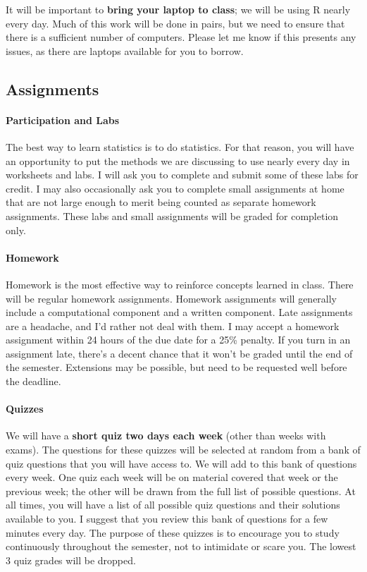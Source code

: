 \documentclass[11pt]{article}
\begin{document}
	It will be important to \textbf{bring your laptop to class}; we will be using R nearly every day.  Much of this work will be done in pairs, but we need to ensure that there is a sufficient number of computers.  Please let me know if this presents any issues, as there are laptops available for you to borrow.
	
	\subsection*{Assignments}
	
	\paragraph{Participation and Labs}
	The best way to learn statistics is to do statistics.  For that reason, you will have an opportunity to put the methods we are discussing to use nearly every day in worksheets and labs.  I will ask you to complete and submit some of these labs for credit.  I may also occasionally ask you to complete small assignments at home that are not large enough to merit being counted as separate homework assignments.  These labs and small assignments will be graded for completion only.
	
	\paragraph{Homework}
	Homework is the most effective way to reinforce concepts learned in class. There will be regular homework assignments. Homework assignments will generally include a computational component and a written component.  Late assignments are a headache, and I'd rather not deal with them. I may accept a homework assignment within 24 hours of the due date for a 25\% penalty. If you turn in an assignment late, there's a decent chance that it won't be graded until the end of the semester. Extensions may be possible, but need to be requested well before the deadline.
	
	\paragraph{Quizzes}
	We will have a \textbf{short quiz two days each week} (other than weeks with exams).  The questions for these quizzes will be selected at random from a bank of quiz questions that you will have access to.  We will add to this bank of questions every week.  One quiz each week will be on material covered that week or the previous week; the other will be drawn from the full list of possible questions.  At all times, you will have a list of all possible quiz questions and their solutions available to you.  I suggest that you review this bank of questions for a few minutes every day.  The purpose of these quizzes is to encourage you to study continuously throughout the semester, not to intimidate or scare you.  The lowest 3 quiz grades will be dropped.
	
\end{document}
